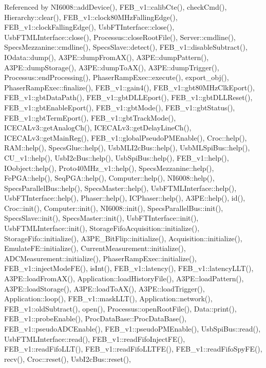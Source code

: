 Referenced by N\+I6008\+::add\+Device(), F\+E\+B\+\_\+v1\+::calib\+Cte(), check\+Cmd(), Hierarchy\+::clear(), F\+E\+B\+\_\+v1\+::clock80\+M\+Hz\+Falling\+Edge(), F\+E\+B\+\_\+v1\+::clock\+Falling\+Edge(), Usb\+F\+T\+Interface\+::close(), Usb\+F\+T\+M\+L\+Interface\+::close(), Processus\+::close\+Root\+File(), Server\+::cmdline(), Specs\+Mezzanine\+::cmdline(), Specs\+Slave\+::detect(), F\+E\+B\+\_\+v1\+::disable\+Subtract(), I\+Odata\+::dump(), A3\+P\+E\+::dump\+From\+A\+X(), A3\+P\+E\+::dump\+Pattern(), A3\+P\+E\+::dump\+Storage(), A3\+P\+E\+::dump\+To\+A\+X(), A3\+P\+E\+::dump\+Trigger(), Processus\+::end\+Processing(), Phaser\+Ramp\+Exec\+::execute(), export\+\_\+obj(), Phaser\+Ramp\+Exec\+::finalize(), F\+E\+B\+\_\+v1\+::gain4(), F\+E\+B\+\_\+v1\+::gbt80\+M\+Hz\+Clk\+Eport(), F\+E\+B\+\_\+v1\+::gbt\+Data\+Path(), F\+E\+B\+\_\+v1\+::gbt\+D\+L\+L\+Eport(), F\+E\+B\+\_\+v1\+::gbt\+D\+L\+L\+Reset(), F\+E\+B\+\_\+v1\+::gbt\+Enable\+Eport(), F\+E\+B\+\_\+v1\+::gbt\+Mode(), F\+E\+B\+\_\+v1\+::gbt\+Status(), F\+E\+B\+\_\+v1\+::gbt\+Term\+Eport(), F\+E\+B\+\_\+v1\+::gbt\+Track\+Mode(), I\+C\+E\+C\+A\+Lv3\+::get\+Analog\+Ch(), I\+C\+E\+C\+A\+Lv3\+::get\+Delay\+Line\+Ch(), I\+C\+E\+C\+A\+Lv3\+::get\+Main\+Reg(), F\+E\+B\+\_\+v1\+::global\+Pseudo\+P\+M\+Enable(), Croc\+::help(), R\+A\+M\+::help(), Specs\+Glue\+::help(), Usb\+M\+L\+I2c\+Bus\+::help(), Usb\+M\+L\+Spi\+Bus\+::help(), C\+U\+\_\+v1\+::help(), Usb\+I2c\+Bus\+::help(), Usb\+Spi\+Bus\+::help(), F\+E\+B\+\_\+v1\+::help(), I\+Oobject\+::help(), Proto40\+M\+Hz\+\_\+v1\+::help(), Specs\+Mezzanine\+::help(), Fe\+P\+G\+A\+::help(), Seq\+P\+G\+A\+::help(), Computer\+::help(), N\+I6008\+::help(), Specs\+Parallel\+Bus\+::help(), Specs\+Master\+::help(), Usb\+F\+T\+M\+L\+Interface\+::help(), Usb\+F\+T\+Interface\+::help(), Phaser\+::help(), I\+C\+Phaser\+::help(), A3\+P\+E\+::help(), id(), Croc\+::init(), Computer\+::init(), N\+I6008\+::init(), Specs\+Parallel\+Bus\+::init(), Specs\+Slave\+::init(), Specs\+Master\+::init(), Usb\+F\+T\+Interface\+::init(), Usb\+F\+T\+M\+L\+Interface\+::init(), Storage\+Fifo\+Acquisition\+::initialize(), Storage\+Fifo\+::initialize(), A3\+P\+E\+\_\+\+Bit\+Flip\+::initialize(), Acquisition\+::initialize(), Emulate\+F\+E\+::initialize(), Current\+Measurement\+::initialize(), A\+D\+C\+Measurement\+::initialize(), Phaser\+Ramp\+Exec\+::initialize(), F\+E\+B\+\_\+v1\+::inject\+Mode\+F\+E(), is\+Int(), F\+E\+B\+\_\+v1\+::latency(), F\+E\+B\+\_\+v1\+::latency\+L\+L\+T(), A3\+P\+E\+::load\+From\+A\+X(), Application\+::load\+History\+File(), A3\+P\+E\+::load\+Pattern(), A3\+P\+E\+::load\+Storage(), A3\+P\+E\+::load\+To\+A\+X(), A3\+P\+E\+::load\+Trigger(), Application\+::loop(), F\+E\+B\+\_\+v1\+::mask\+L\+L\+T(), Application\+::network(), F\+E\+B\+\_\+v1\+::old\+Subtract(), open(), Processus\+::open\+Root\+File(), Data\+::print(), F\+E\+B\+\_\+v1\+::probe\+Enable(), Proc\+Data\+Base\+::\+Proc\+Data\+Base(), F\+E\+B\+\_\+v1\+::pseudo\+A\+D\+C\+Enable(), F\+E\+B\+\_\+v1\+::pseudo\+P\+M\+Enable(), Usb\+Spi\+Bus\+::read(), Usb\+F\+T\+M\+L\+Interface\+::read(), F\+E\+B\+\_\+v1\+::read\+Fifo\+Inject\+F\+E(), F\+E\+B\+\_\+v1\+::read\+Fifo\+L\+L\+T(), F\+E\+B\+\_\+v1\+::read\+Fifo\+L\+L\+T\+F\+E(), F\+E\+B\+\_\+v1\+::read\+Fifo\+Spy\+F\+E(), recv(), Croc\+::reset(), Usb\+I2c\+Bus\+::reset(), 